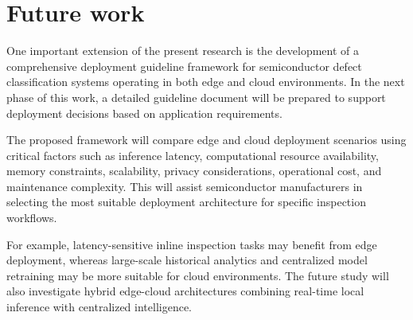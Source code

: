 \chapter{Future work}

One important extension of the present research is the development of a comprehensive deployment guideline framework for semiconductor defect classification systems operating in both edge and cloud environments. In the next phase of this work, a detailed guideline document will be prepared to support deployment decisions based on application requirements.

The proposed framework will compare edge and cloud deployment scenarios using critical factors such as inference latency, computational resource availability, memory constraints, scalability, privacy considerations, operational cost, and maintenance complexity. This will assist semiconductor manufacturers in selecting the most suitable deployment architecture for specific inspection workflows.

For example, latency-sensitive inline inspection tasks may benefit from edge deployment, whereas large-scale historical analytics and centralized model retraining may be more suitable for cloud environments. The future study will also investigate hybrid edge-cloud architectures combining real-time local inference with centralized intelligence.